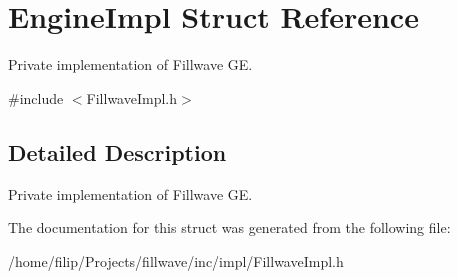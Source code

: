 \hypertarget{structEngineImpl}{}\section{Engine\+Impl Struct Reference}
\label{structEngineImpl}


Private implementation of Fillwave GE.  




{\ttfamily \#include $<$Fillwave\+Impl.\+h$>$}



\subsection{Detailed Description}
Private implementation of Fillwave GE. 

The documentation for this struct was generated from the following file\+:\begin{DoxyCompactItemize}
\item 
/home/filip/\+Projects/fillwave/inc/impl/Fillwave\+Impl.\+h\end{DoxyCompactItemize}
